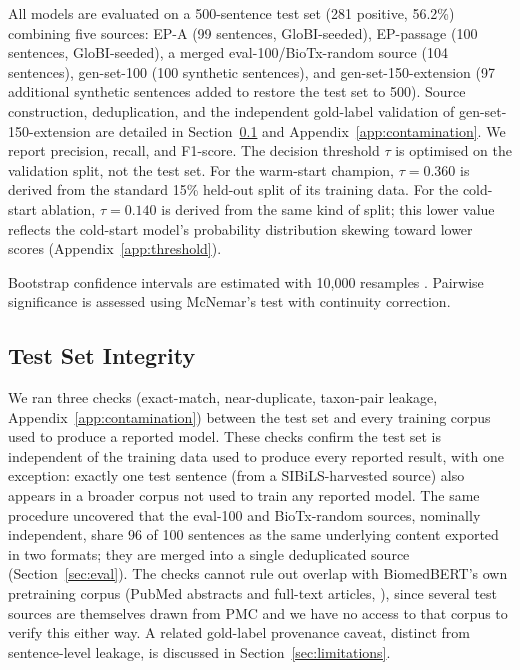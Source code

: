 \documentclass[11pt,twocolumn]{article}
\begin{document}
All models are evaluated on a 500-sentence test set (281 positive,
56.2\%) combining five sources: EP-A (99 sentences, GloBI-seeded),
EP-passage (100 sentences, GloBI-seeded), a merged eval-100/BioTx-random
source (104 sentences), gen-set-100 (100 synthetic sentences), and
gen-set-150-extension (97 additional synthetic sentences added to
restore the test set to 500). Source construction, deduplication, and
the independent gold-label validation of gen-set-150-extension are
detailed in Section~\ref{sec:contamination} and
Appendix~\ref{app:contamination}.
We report precision, recall, and F1-score.
The decision threshold $\tau$ is optimised on the validation split,
not the test set. For the warm-start champion, $\tau = 0.360$ is derived
from the standard 15\% held-out split of its training data. For the
cold-start ablation, $\tau = 0.140$ is derived from the same kind of split;
this lower value reflects the cold-start model's probability
distribution skewing toward lower scores (Appendix~\ref{app:threshold}).

Bootstrap confidence intervals are estimated with 10,000 resamples
\citep{efron1993introduction}.
Pairwise significance is assessed using McNemar's test
\citep{mcnemar1947note} with continuity correction.

\subsection{Test Set Integrity}
\label{sec:contamination}

We ran three checks (exact-match, near-duplicate, taxon-pair leakage,
Appendix~\ref{app:contamination}) between the test set and every
training corpus used to produce a reported model. These checks confirm
the test set is independent of the training data used to produce every
reported result, with one exception: exactly one test sentence (from a
SIBiLS-harvested source) also appears in a broader corpus not used to
train any reported model. The same procedure uncovered that the
eval-100 and BioTx-random sources, nominally independent, share 96 of
100 sentences as the same underlying content exported in two formats;
they are merged into a single deduplicated source (Section~\ref{sec:eval}).
The checks cannot rule out overlap with BiomedBERT's own pretraining
corpus (PubMed abstracts and full-text articles,
\citealt{gu2021domain}), since several test sources are themselves
drawn from PMC and we have no access to that corpus to verify this
either way. A related gold-label provenance caveat, distinct from
sentence-level leakage, is discussed in Section~\ref{sec:limitations}.
\end{document}

